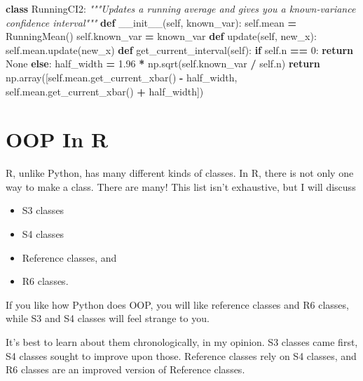 \documentclass[
  12pt,
]{krantz}
\makeatletter
\newenvironment{Shaded}{\begin{snugshade}}{\end{snugshade}}
\newcommand{\CommentTok}[1]{\textcolor[rgb]{0.37,0.37,0.37}{\textit{#1}}}
\newcommand{\ControlFlowTok}[1]{\textcolor[rgb]{0.27,0.27,0.27}{\textbf{#1}}}
\newcommand{\DecValTok}[1]{\textcolor[rgb]{0.06,0.06,0.06}{#1}}
\newcommand{\FloatTok}[1]{\textcolor[rgb]{0.06,0.06,0.06}{#1}}
\newcommand{\FunctionTok}[1]{\textcolor[rgb]{0,0,0}{#1}}
\newcommand{\KeywordTok}[1]{\textcolor[rgb]{0.27,0.27,0.27}{\textbf{#1}}}
\newcommand{\NormalTok}[1]{#1}
\newcommand{\OperatorTok}[1]{\textcolor[rgb]{0.43,0.43,0.43}{\textbf{#1}}}
\newcommand{\VariableTok}[1]{\textcolor[rgb]{0,0,0}{#1}}
\providecommand{\tightlist}{%
  \setlength{\itemsep}{0pt}\setlength{\parskip}{0pt}}
\newenvironment{kframe}{%
\medskip{}
\setlength{\fboxsep}{.8em}
 \def\at@end@of@kframe{}%
 \ifinner\ifhmode%
  \def\at@end@of@kframe{\end{minipage}}%
  \begin{minipage}{\columnwidth}%
 \fi\fi%
 \def\FrameCommand##1{\hskip\@totalleftmargin \hskip-\fboxsep
 \colorbox{shadecolor}{##1}\hskip-\fboxsep
     \hskip-\linewidth \hskip-\@totalleftmargin \hskip\columnwidth}%
 \MakeFramed {\advance\hsize-\width
   \@totalleftmargin\z@ \linewidth\hsize
   \@setminipage}}%
 {\par\unskip\endMakeFramed%
 \at@end@of@kframe}
\renewenvironment{Shaded}{\begin{kframe}}{\end{kframe}}
\makeatother
\begin{document}
\begin{Shaded}
\begin{Highlighting}[]
\KeywordTok{class}\NormalTok{ RunningCI2:}
  \CommentTok{"""Updates a running average and gives you a known{-}variance confidence interval"""}
  \KeywordTok{def} \FunctionTok{\_\_init\_\_}\NormalTok{(}\VariableTok{self}\NormalTok{, known\_var):}
    \VariableTok{self}\NormalTok{.mean }\OperatorTok{=}\NormalTok{ RunningMean()}
    \VariableTok{self}\NormalTok{.known\_var }\OperatorTok{=}\NormalTok{ known\_var}
  \KeywordTok{def}\NormalTok{ update(}\VariableTok{self}\NormalTok{, new\_x):    }
    \VariableTok{self}\NormalTok{.mean.update(new\_x)}
  \KeywordTok{def}\NormalTok{ get\_current\_interval(}\VariableTok{self}\NormalTok{):}
    \ControlFlowTok{if} \VariableTok{self}\NormalTok{.n }\OperatorTok{==} \DecValTok{0}\NormalTok{:}
      \ControlFlowTok{return} \VariableTok{None}
    \ControlFlowTok{else}\NormalTok{:}
\NormalTok{      half\_width }\OperatorTok{=} \FloatTok{1.96} \OperatorTok{*}\NormalTok{ np.sqrt(}\VariableTok{self}\NormalTok{.known\_var }\OperatorTok{/} \VariableTok{self}\NormalTok{.n)  }
      \ControlFlowTok{return}\NormalTok{ np.array([}\VariableTok{self}\NormalTok{.mean.get\_current\_xbar() }\OperatorTok{{-}}\NormalTok{ half\_width, }\VariableTok{self}\NormalTok{.mean.get\_current\_xbar() }\OperatorTok{+}\NormalTok{ half\_width])}
\end{Highlighting}
\end{Shaded}

\hypertarget{oop-in-r}{%
\section{OOP In R}\label{oop-in-r}}

R, unlike Python, has many different kinds of classes. In R, there is not only one way to make a class. There are many! This list isn't exhaustive, but I will discuss

\begin{itemize}
\tightlist
\item
  S3 classes
\item
  S4 classes
\item
  Reference classes, and
\item
  R6 classes.
\end{itemize}

If you like how Python does OOP, you will like reference classes and R6 classes, while S3 and S4 classes will feel strange to you.

It's best to learn about them chronologically, in my opinion. S3 classes came first, S4 classes sought to improve upon those. Reference classes rely on S4 classes, and R6 classes are an improved version of Reference classes.
\end{document}
